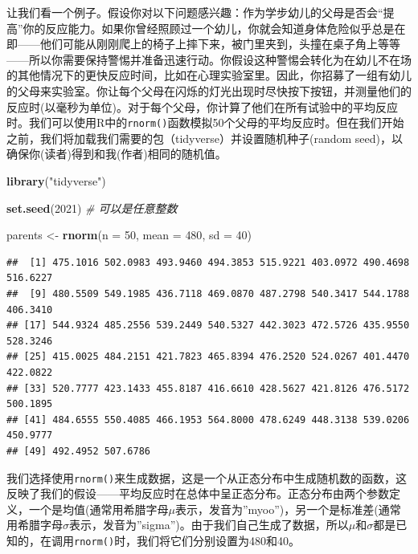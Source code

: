 \documentclass[
]{book}
\newenvironment{Shaded}{\begin{snugshade}}{\end{snugshade}}
\newcommand{\AttributeTok}[1]{\textcolor[rgb]{0.13,0.29,0.53}{#1}}
\newcommand{\CommentTok}[1]{\textcolor[rgb]{0.56,0.35,0.01}{\textit{#1}}}
\newcommand{\DecValTok}[1]{\textcolor[rgb]{0.00,0.00,0.81}{#1}}
\newcommand{\FunctionTok}[1]{\textcolor[rgb]{0.13,0.29,0.53}{\textbf{#1}}}
\newcommand{\NormalTok}[1]{#1}
\newcommand{\OtherTok}[1]{\textcolor[rgb]{0.56,0.35,0.01}{#1}}
\newcommand{\StringTok}[1]{\textcolor[rgb]{0.31,0.60,0.02}{#1}}
\begin{document}
让我们看一个例子。假设你对以下问题感兴趣：作为学步幼儿的父母是否会``提高''你的反应能力。如果你曾经照顾过一个幼儿，你就会知道身体危险似乎总是在即------他们可能从刚刚爬上的椅子上摔下来，被门里夹到，头撞在桌子角上等等------所以你需要保持警惕并准备迅速行动。你假设这种警惕会转化为在幼儿不在场的其他情况下的更快反应时间，比如在心理实验室里。因此，你招募了一组有幼儿的父母来实验室。你让每个父母在闪烁的灯光出现时尽快按下按钮，并测量他们的反应时(以毫秒为单位)。对于每个父母，你计算了他们在所有试验中的平均反应时。我们可以使用R中的\texttt{rnorm()}函数模拟50个父母的平均反应时。但在我们开始之前，我们将加载我们需要的包（tidyverse）并设置随机种子(random seed)，以确保你(读者)得到和我(作者)相同的随机值。

\begin{Shaded}
\begin{Highlighting}[]
\FunctionTok{library}\NormalTok{(}\StringTok{"tidyverse"}\NormalTok{)}

\FunctionTok{set.seed}\NormalTok{(}\DecValTok{2021}\NormalTok{)  }\CommentTok{\# 可以是任意整数}
\end{Highlighting}
\end{Shaded}

\begin{Shaded}
\begin{Highlighting}[]
\NormalTok{parents }\OtherTok{\textless{}{-}} \FunctionTok{rnorm}\NormalTok{(}\AttributeTok{n =} \DecValTok{50}\NormalTok{, }\AttributeTok{mean =} \DecValTok{480}\NormalTok{, }\AttributeTok{sd =} \DecValTok{40}\NormalTok{)}
\end{Highlighting}
\end{Shaded}

\begin{verbatim}
##  [1] 475.1016 502.0983 493.9460 494.3853 515.9221 403.0972 490.4698 516.6227
##  [9] 480.5509 549.1985 436.7118 469.0870 487.2798 540.3417 544.1788 406.3410
## [17] 544.9324 485.2556 539.2449 540.5327 442.3023 472.5726 435.9550 528.3246
## [25] 415.0025 484.2151 421.7823 465.8394 476.2520 524.0267 401.4470 422.0822
## [33] 520.7777 423.1433 455.8187 416.6610 428.5627 421.8126 476.5172 500.1895
## [41] 484.6555 550.4085 466.1953 564.8000 478.6249 448.3138 539.0206 450.9777
## [49] 492.4952 507.6786
\end{verbatim}

我们选择使用\texttt{rnorm()}来生成数据，这是一个从正态分布中生成随机数的函数，这反映了我们的假设------平均反应时在总体中呈正态分布。正态分布由两个参数定义，一个是均值(通常用希腊字母\(\mu\)表示，发音为''myoo'')，另一个是标准差(通常用希腊字母\(\sigma\)表示，发音为''sigma'')。由于我们自己生成了数据，所以\(\mu\)和\(\sigma\)都是已知的，在调用\texttt{rnorm()}时，我们将它们分别设置为480和40。
\end{document}

